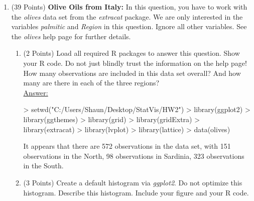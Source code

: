\documentclass[12pt,letterpaper,final]{article}
\begin{document}
\begin{enumerate}


\item (39 Points) {\bf Olive Oils from Italy:}
In this question, you have to work with the {\it olives} data set from the {\it extracat} package.
We are only interested in the variables {\it palmitic} and {\it Region}
in this question. Ignore all other variables.
See the {\it olives} help page for further details.


\begin{enumerate}
\item (2 Points) 
Load all required R packages to answer this question. Show your R code.
Do not just blindly trust the information on the help page! How many observations are included 
in this data set overall? And how many are there in each of the three regions?\\

\underline{Answer:}
{\scriptsize
\begin{Schunk}
\begin{Sinput}
> setwd("C:/Users/Shaun/Desktop/StatVis/HW2")
> library(ggplot2)
> library(ggthemes)
> library(grid)
> library(gridExtra)
> library(extracat)
> library(lvplot)
> library(lattice)
> data(olives)
\end{Sinput}
\end{Schunk}
It appears that there are 572 observations in the data set, with 151 observations in the North, 98 observations in Sardinia, 323 observations in the South.
}


\item (3 Points) 
Create a default histogram via {\it ggplot2}. Do not optimize
this histogram. Describe this histogram. 
Include your figure and your R code. \\


\end{enumerate}
\end{enumerate}
\end{document}
